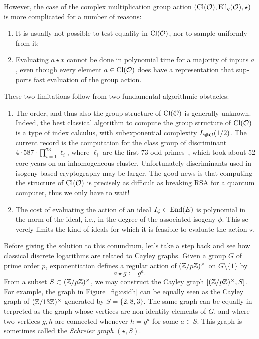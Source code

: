 \begin{otherlanguage}{english}
  However, the case of the complex multiplication group action
  $(\mathrm{Cl}(\mathcal{O}), \mathrm{Ell}_q(\mathcal{O}), \star)$ is more complicated for a number of
  reasons:
  \begin{enumerate}
  \item It is usually not possible to test equality in $\mathrm{Cl}(\mathcal{O})$, nor
    to sample uniformly from it;
  \item Evaluating $a\star x$ cannot be done in polynomial time for a
    majority of inputs $a$, even though every element $a\in\mathrm{Cl}(\mathcal{O})$
    does have a representation that supports fast evaluation of the
    group action.
  \end{enumerate}
  These two limitations follow from two fundamental algorithmic
  obstacles:
  \begin{enumerate}
  \item The order, and thus also the group structure of $\mathrm{Cl}(\mathcal{O})$ is
    generally unknown. Indeed, the best classical algorithm to compute
    the group structure of $\mathrm{Cl}(\mathcal{O})$ is a type of index calculus, with
    subexponential complexity $L_{\#\mathcal{O}}(1/2)$. The current record is
    the computation for the class group of discriminant
    $4\cdot 587\cdot\prod_{i=1}^{73} \ell_i$, where $\ell_i$ are the
    first $73$ odd primes~\cite{AC:BeuKleVer19}, which
    took about 52 core years on an inhomogeneous
    cluster. Unfortunately discriminants used in isogeny based
    cryptography may be larger. The good news is that computing the
    structure of $\mathrm{Cl}(\mathcal{O})$ is precisely as difficult as breaking RSA
    for a quantum computer, thus we only have to wait!
  \item The cost of evaluating the action of an ideal
    $I_\phi\subset\mathrm{End}(E)$ is polynomial in the norm of the ideal,
    i.e., in the degree of the associated isogeny $\phi$. This
    severely limits the kind of ideals for which it is feasible to
    evaluate the action $\star$.
  \end{enumerate}

  Before giving the solution to this conundrum, let's take a step back
  and see how classical discrete logarithms are related to Cayley
  graphs. Given a group $G$ of prime order $p$, exponentiation defines
  a regular action of $(\mathbb{Z}/p\mathbb{Z})^\times$ on $G\setminus\{1\}$ by
  \[a\star g := g^a.\] %
  From a subset $S\subset(\mathbb{Z}/p\mathbb{Z})^\times$, we may construct the Cayley
  graph $[(\mathbb{Z}/p\mathbb{Z})^\times,S]$. For example, the graph in
  Figure~\ref{fig:csidh} can be equally seen as the Cayley graph of
  $(\mathbb{Z}/13\mathbb{Z})^\times$ generated by $S=\{2,8,3\}$. The same graph can be
  equally interpreted as the graph whose vertices are non-identity
  elements of $G$, and where two vertices $g,h$ are connected whenever
  $h=g^a$ for some $a\in S$. This graph is sometimes called the
  \emph{Schreier graph} $(\star,S)$.


\end{otherlanguage}
